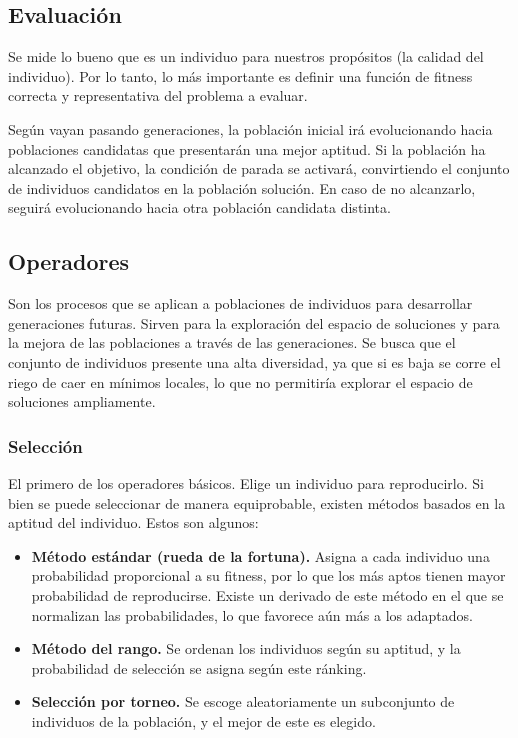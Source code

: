 \subsection{Evaluación}

Se mide lo bueno que es un individuo para nuestros propósitos (la calidad del individuo). Por lo tanto, lo más importante es definir una función de fitness correcta y representativa del problema a evaluar.

Según vayan pasando generaciones, la población inicial irá evolucionando hacia poblaciones candidatas que presentarán una mejor aptitud. Si la población ha alcanzado el objetivo, la condición de parada se activará, convirtiendo el conjunto de individuos candidatos en la población solución. En caso de no alcanzarlo, seguirá evolucionando hacia otra población candidata distinta.

\subsection{Operadores}

Son los procesos que se aplican a poblaciones de individuos para desarrollar generaciones futuras. Sirven para la exploración del espacio de soluciones y para la mejora de las poblaciones a través de las generaciones. Se busca que el conjunto de individuos presente una alta diversidad, ya que si es baja se corre el riego de caer en mínimos locales, lo que no permitiría explorar el espacio de soluciones ampliamente.


\subsubsection{Selección}

El primero de los operadores básicos. Elige un individuo para reproducirlo. Si bien se puede seleccionar de manera equiprobable, existen métodos basados en la aptitud del individuo. Estos son algunos:

\begin{itemize}
  \item \textbf{Método estándar (rueda de la fortuna).} Asigna a cada individuo una probabilidad proporcional a su fitness, por lo que los más aptos tienen mayor probabilidad de reproducirse. Existe un derivado de este método en el que se normalizan las probabilidades, lo que favorece aún más a los adaptados.
  \item \textbf{Método del rango.} Se ordenan los individuos según su aptitud, y la probabilidad de selección se asigna según este ránking.
  \item \textbf{Selección por torneo.} Se escoge aleatoriamente un subconjunto de individuos de la población, y el mejor de este es elegido.
\end{itemize}

